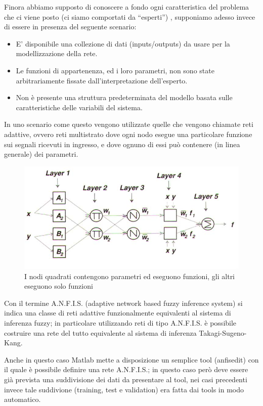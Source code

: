 Finora abbiamo supposto di conoscere a fondo ogni caratteristica del problema che ci viene posto (ci siamo comportati da “esperti”) , supponiamo adesso invece di essere in presenza del seguente scenario:

\begin{itemize}
  \item E' disponibile una collezione di dati (inputs/outputs) da usare per la modellizzazione della rete.
  \item Le funzioni di appartenenza, ed i loro parametri, non sono state arbitrariamente fissate dall'interpretazione dell'esperto.
  \item Non è presente una struttura predeterminata del modello basata sulle caratteristiche delle variabili del sistema.
\end{itemize}

In uno scenario come questo vengono utilizzate quelle che vengono chiamate reti adattive, ovvero reti multistrato dove ogni nodo esegue una particolare funzione sui segnali ricevuti in ingresso, e dove ognuno di essi può contenere (in linea generale) dei parametri.
\begin{figure}[htbp]
  \centering
  \includegraphics[scale=0.5]{images/anfis/adaptive.png}
  \caption{I nodi quadrati contengono parametri ed eseguono funzioni, gli altri eseguono solo funzioni}
\end{figure}

Con il termine A.N.F.I.S. (adaptive network based fuzzy inference system) si indica una classe di reti adattive funzionalmente equivalenti al sistema di inferenza fuzzy; in particolare utilizzando reti di tipo A.N.F.I.S. è possibile costruire una rete del tutto equivalente al sistema di inferenza Takagi-Sugeno-Kang.

Anche in questo caso Matlab mette a disposizione un semplice tool (anfisedit) con il quale è possibile definire una rete A.N.F.I.S.; in questo caso però deve essere già prevista una suddivisione dei dati da presentare al tool, nei casi precedenti invece tale suddivione (training, test e validation) era fatta dai tools in modo automatico.

